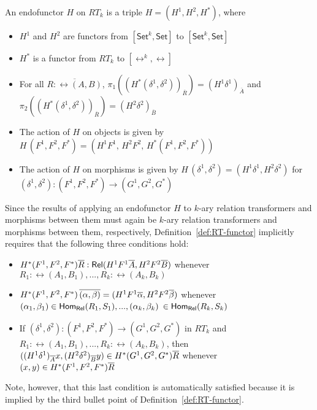 \documentclass{lmcs}
\theoremstyle{plain}\newtheorem{satz}[thm]{Satz}
\newcommand{\set}{\mathsf{Set}}
\begin{document}
{\begin{defi}\label{def:RT-functor}
An endofunctor $H$ on $RT_k$ is a triple $H = (H^1,H^2,H^*)$, where
\begin{itemize}
\item $H^1$ and $H^2$ are functors from $[\set^k,\set]$ to $[\set^k,\set]$
\item $H^*$ is a functor from $RT_k$ to $[\rel^k,\rel]$
\item For all $\overline{R : \rel(A,B)}$,
  $\pi_1((H^*(\delta^1,\delta^2))_{\overline{R}}) = (H^1
  \delta^1)_{\overline{A}}$ and
  $\pi_2((H^*(\delta^1,\delta^2))_{\overline{R}}) = (H^2
  \delta^2)_{\overline{B}}$
\item The action of $H$ on objects is given by $H\,(F^1,F^2,F^*) =
  (H^1F^1,\,H^2F^2,\,H^*(F^1,F^2,F^*))$
\item The action of $H$ on morphisms is given by
  $H\,(\delta^1,\delta^2) = (H^1\delta^1,H^2\delta^2)$ for
  $(\delta^1,\delta^2) : (F^1,F^2,F^*)\to (G^1,G^2,G^*)$
\end{itemize}
\end{defi}
Since the results of applying an endofunctor $H$ to $k$-ary relation
transformers and morphisms between them must again be $k$-ary relation
transformers and morphisms between them, respectively,
Definition~\ref{def:RT-functor} implicitly requires that the following
three conditions hold:
\begin{itemize}
\item $H^*(F^1,F^2,F^*) \overline{R} : \mathsf{Rel}(H^1F^1 \overline{A}, H^2F^2 \overline{B})$
  whenever $R_1:\rel(A_1,B_1),...,R_k:\rel(A_k,B_k)$
\item $H^*(F^1,F^2,F^*)\, \overline{(\alpha, \beta)} = (H^1F^1\overline{\alpha},
  H^2F^2 \overline{\beta})$ whenever $(\alpha_1, \beta_1) \in
  \mathsf{Hom_{Rel}}(R_1,S_1),..., (\alpha_k, \beta_k)$ $\in \mathsf{Hom_{Rel}}(R_k,S_k)$
\item If $(\delta^1,\delta^2) : (F^1,F^2,F^*)\to (G^1,G^2,G^*)$ in
  $RT_k$ and $R_1:\rel(A_1,B_1),...,R_k:\rel(A_k,B_k)$, then
  $((H^1\delta^1)_{\overline{A}}x, (H^2\delta^2)_{\overline{B}}y) \in
  H^*(G^1,G^2,G^*)\overline{R}$ whenever $(x, y) \in H^*(F^1,F^2,F^*)\overline{R}$
\end{itemize}
  Note, however, that this last condition is
  automatically satisfied because it is implied by the third bullet
  point of Definition~\ref{def:RT-functor}.

}
\end{document}
